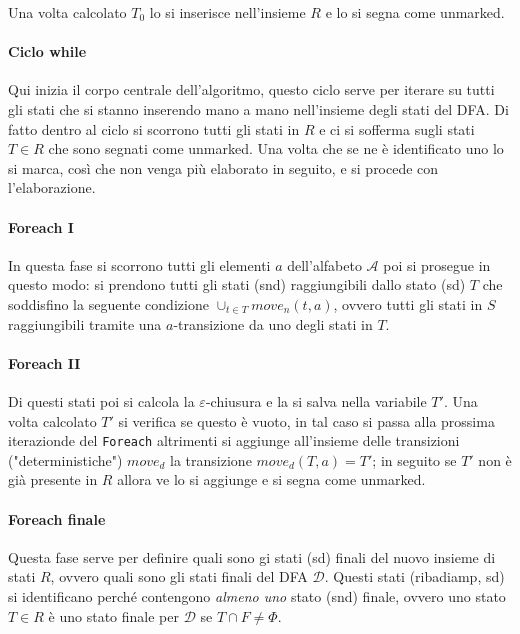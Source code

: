 \documentclass[class=book, crop=false, oneside, 12pt]{standalone}
\begin{document}
Una volta calcolato \(T_0\) lo si inserisce nell'insieme \(R\) e lo si segna come unmarked.

\paragraph*{Ciclo while}
Qui inizia il corpo centrale dell'algoritmo, questo ciclo serve per iterare su tutti gli stati che si stanno inserendo mano a mano nell'insieme degli stati del DFA. Di fatto dentro al ciclo si scorrono tutti gli stati in \(R\) e ci si sofferma sugli stati \(T \in R\) che sono segnati come unmarked. Una volta che se ne è identificato uno lo si marca, così che non venga più elaborato in seguito, e si procede con l'elaborazione.

\paragraph*{Foreach I}
In questa fase si scorrono tutti gli elementi \(a\) dell'alfabeto \(\mathcal{A}\) poi si prosegue in questo modo:
si prendono tutti gli stati (snd) raggiungibili dallo stato (sd) \(T\) che soddisfino la seguente condizione \(\cup_{t \in T} move_n(t,a)\), ovvero tutti gli stati in \(S\) raggiungibili tramite una \(a\)-transizione da uno degli stati in \(T\).

\paragraph*{Foreach II}
Di questi stati poi si calcola la \(\varepsilon\)-chiusura e la si salva nella variabile \(T'\).
Una volta calcolato \(T'\) si verifica se questo è vuoto, in tal caso si passa alla prossima iterazionde del \texttt{Foreach} altrimenti si aggiunge all'insieme delle transizioni ("deterministiche") \(move_d\) la transizione \(move_d(T, a) = T'\); in seguito se \(T'\) non è già presente in \(R\) allora ve lo si aggiunge e si segna come unmarked.

\paragraph*{Foreach finale}
Questa fase serve per definire quali sono gi stati (sd) finali del nuovo insieme di stati \(R\), ovvero quali sono gli stati finali del DFA \(\mathcal{D}\). Questi stati (ribadiamp, sd) si identificano perché contengono \emph{almeno uno} stato (snd) finale, ovvero uno stato \(T \in R\) è uno stato finale per \(\mathcal{D}\) se \(T \cap F \neq \Phi\).
\end{document}
